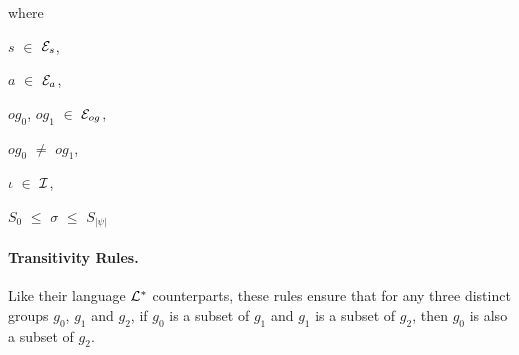 \documentclass[11pt]{report}
\newenvironment{vquote}
{
  \begin{list}{}{\leftmargin 1em}\item[]
}
{
  \end{list}
}
\begin{document}
\begin{enumerate}
                  \begin{vquote}
                    where

                    \hspace{1em}
                    $s$ $\in$ ${\cal E}_{s}$,

                    \hspace{1em}
                    $a$ $\in$ ${\cal E}_{a}$,

                    \hspace{1em}
                    $og_0$, $og_1$ $\in$ ${\cal E}_{og}$,

                    \hspace{1em}
                    $og_0$ $\neq$ $og_1$,

                    \hspace{1em}
                    $\iota$ $\in$ ${\cal I}$,

                    \hspace{1em}
                    $S_{0}$ $\leq$ $\sigma$ $\leq$ $S_{|\psi|}$
                  \end{vquote}
              \end{enumerate}

          \paragraph
            {\bf Transitivity Rules.}

            Like their language ${\cal L^*}$ counterparts, these rules ensure
            that for any three distinct groups $g_0$, $g_1$ and $g_2$, if
            $g_0$ is a subset of $g_1$ and $g_1$ is a subset of $g_2$, then
            $g_0$ is also a subset of $g_2$.
\end{document}
